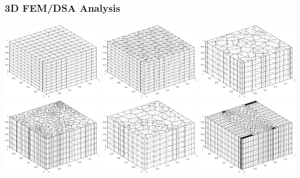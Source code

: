\documentclass[compress,10pt]{beamer}
\begin{document}
\subsection{}
\begin{frame}[t]\frametitle{3D FEM/DSA Analysis}
\centering
\vspace{0.2cm}
\includegraphics[width=0.32\textwidth]{images/3D_cart_mesh.eps} 
\includegraphics[width=0.32\textwidth]{images/3D_tri_mesh.eps}
\includegraphics[width=0.32\textwidth]{images/3D_rand_poly_mesh.eps}  \\
\vspace{0.2cm}
\includegraphics[width=0.32\textwidth]{images/3D_shes_poly_mesh.eps} 
\includegraphics[width=0.32\textwidth]{images/3D_sine_poly_mesh.eps} 
\includegraphics[width=0.32\textwidth]{images/3D_z_poly_mesh.eps} 
\end{frame}
\end{document}
